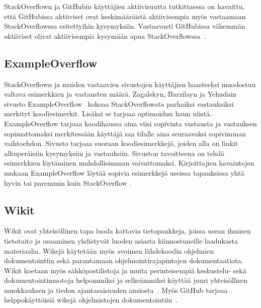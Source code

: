 \documentclass[finnish]{tktltiki2}
\theoremstyle{definition}
\theoremstyle{remark}
\begin{document}
StackOverflown ja GitHubin käyttäjien aktiivisuutta tutkittaessa on havaittu, että GitHubissa aktiiviset ovat keskimääräistä aktiivisempia myös vastaamaan StackOverflowssa esitettyihin kysymyksiin. Vastaavasti GitHubissa vähemmän aktiiviset olivat aktiivisempia kysymään apua StackOverflowssa~\cite{stackoverflow-and-github}.

\subsection{ExampleOverflow}
StackOverflown ja muiden vastaavien sivustojen käyttäjien haasteeksi muodostuu valtava esimerkkien ja vastausten määrä. Zagalskyn, Barzilayn ja Yehudain sivusto ExampleOverflow~\cite{example-overflow-social-media-for-code-recommendations} kokoaa StackOverflowsta parhaiksi vastauksiksi merkityt koodiesimerkit. Lisäksi se tarjoaa optimoidun haun niistä. ExampleOverflow tarjoaa koodihaussa aina viisi sopivinta vastausta ja vastauksen sopimattomaksi merkitessään käyttäjä saa tilalle aina seuraavaksi sopivimman vaihtoehdon. Sivusto tarjoaa suoraan koodiesimerkkejä, joiden alla on linkit alkuperäisiin kysymyksiin ja vastauksiin. Sivuston tavoitteena on tehdä esimerkkien löytäminen mahdollisimman vaivattomaksi. Kirjoittajien havaintojen mukaan ExampleOverflow löytää sopivia esimerkkejä useissa tapauksissa yhtä hyvin tai paremmin kuin StackOverflow \cite{example-overflow-social-media-for-code-recommendations}.

\subsection{Wikit}
Wikit ovat yhteisöllinen tapa luoda kattavia tietopankkeja, joissa usean ihmisen tietotaito ja osaaminen yhdistyvät luoden asiasta kiinnostuneille laadukasta materiaalia. Wikejä käytetään myös avoimen lähdekoodin ohjelmien dokumentointiin sekä parantamaan ohjelmointirajapintojen dokumentaatiota. Wikit koetaan myös sähköpostilistoja ja muita perinteisempiä keskustelu- sekä dokumentointimuotoja helpommiksi ja selkeämmiksi käyttää juuri yhteisöllisen muokkauksen ja tiedon ajantasaisuuden ansiosta~\cite{using-wikis-in-sw}.
Myös GitHub tarjoaa helppokäyttöisiä wikejä ohjelmistojen dokumentointiin~\cite{github-wiki}.
\end{document}
